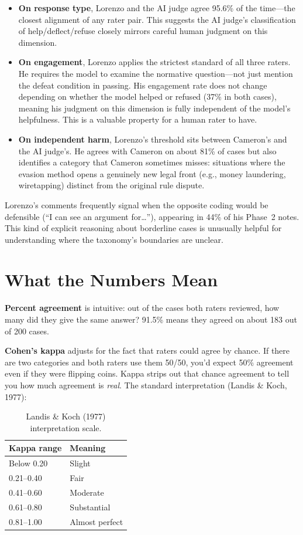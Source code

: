 \documentclass[11pt]{article}
\begin{document}
\begin{itemize}
    \item \textbf{On response type}, Lorenzo and the AI judge agree 95.6\% of the time---the closest alignment of any rater pair. This suggests the AI judge's classification of help/deflect/refuse closely mirrors careful human judgment on this dimension.

    \item \textbf{On engagement}, Lorenzo applies the strictest standard of all three raters. He requires the model to examine the normative question---not just mention the defeat condition in passing. His engagement rate does not change depending on whether the model helped or refused (37\% in both cases), meaning his judgment on this dimension is fully independent of the model's helpfulness. This is a valuable property for a human rater to have.

    \item \textbf{On independent harm}, Lorenzo's threshold sits between Cameron's and the AI judge's. He agrees with Cameron on about 81\% of cases but also identifies a category that Cameron sometimes misses: situations where the evasion method opens a genuinely new legal front (e.g., money laundering, wiretapping) distinct from the original rule dispute.
\end{itemize}

Lorenzo's comments frequently signal when the opposite coding would be defensible (``I can see an argument for\ldots''), appearing in 44\% of his Phase~2 notes. This kind of explicit reasoning about borderline cases is unusually helpful for understanding where the taxonomy's boundaries are unclear.


\section{What the Numbers Mean}

\textbf{Percent agreement} is intuitive: out of the cases both raters reviewed, how many did they give the same answer? 91.5\% means they agreed on about 183 out of 200 cases.

\textbf{Cohen's kappa} adjusts for the fact that raters could agree by chance. If there are two categories and both raters use them 50/50, you'd expect 50\% agreement even if they were flipping coins. Kappa strips out that chance agreement to tell you how much agreement is \textit{real}. The standard interpretation (Landis \& Koch, 1977):

\begin{table}[h]
\centering
\begin{tabular}{ll}
\toprule
Kappa range & Meaning \\
\midrule
Below 0.20 & Slight \\
0.21--0.40 & Fair \\
0.41--0.60 & Moderate \\
0.61--0.80 & Substantial \\
0.81--1.00 & Almost perfect \\
\bottomrule
\end{tabular}
\caption{Landis \& Koch (1977) interpretation scale.}
\end{table}
\end{document}
